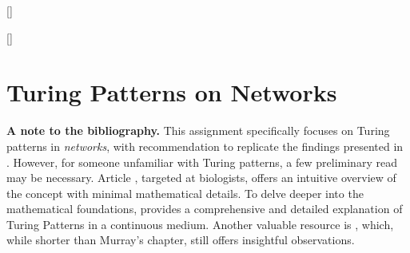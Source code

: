 \documentclass[12pt]{report}
\begin{document}
    
    
    \begingroup
        \hypersetup{linkcolor=black}
        \tableofcontents
    \endgroup
       \clearpage{}
    
\titleformat{\section}[hang]{\large\bfseries}{\textcolor{unipd}{\thesection}\hsp\textcolor{gray75}{|}\hsp}{0pt}{\large\bfseries\textcolor{gray25}}[\color{unipd}{\titlerule[1.0pt]}]
\titleformat{\subsection}[hang]{\large\bfseries}{\textcolor{unipd}{\thesubsection}\hsp\textcolor{gray75}{|}\hsp}{0pt}{\large\bfseries\textcolor{gray25}}[\color{unipd}{}]




\chapter{Turing Patterns on Networks}
    
    
    
    
    
    
    
    \medskip
    \newline
    \noindent
    \textbf{A note to the bibliography.}
    This assignment specifically focuses on Turing patterns in \textit{networks}, with recommendation to replicate the findings presented in \cite{main_network}. However, for someone unfamiliar with Turing patterns, a few preliminary read may be necessary. Article \cite{bio_article}, targeted at biologists, offers an intuitive overview of the concept with minimal mathematical details. To delve deeper into the mathematical foundations, \cite[][\textit{Chapter 2: Spatial Pattern Formation with Reaction Diffusion Systems}]{murray} provides a comprehensive and detailed explanation of Turing Patterns in a continuous medium. Another valuable resource is \cite[][\textit{Chapter 7: The Turing Model for Biological Pattern Formation}]{altbook}, which, while shorter than Murray’s chapter, still offers insightful observations.    
\end{document}
